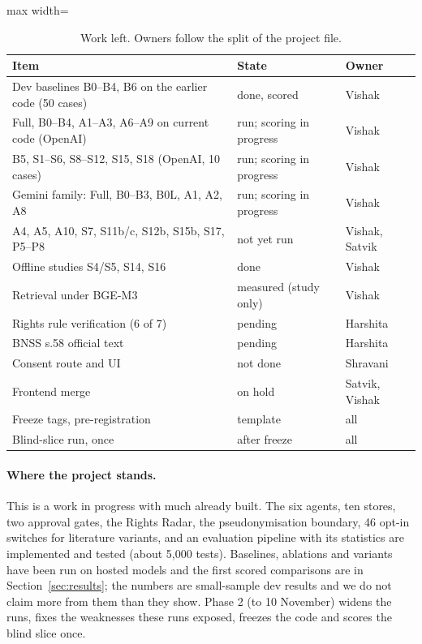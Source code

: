 \begin{table}[!t]
\centering\small
\begin{adjustbox}{max width=\textwidth}
\begin{tabular}{@{}p{3.6cm}p{1.5cm}p{1.5cm}@{}}
\toprule
Item & State & Owner \\
\midrule
Dev baselines B0--B4, B6 on the earlier code (50 cases) & done, scored & Vishak \\
Full, B0--B4, A1--A3, A6--A9 on current code (OpenAI) & run; scoring in progress & Vishak \\
B5, S1--S6, S8--S12, S15, S18 (OpenAI, 10 cases) & run; scoring in progress & Vishak \\
Gemini family: Full, B0--B3, B0L, A1, A2, A8 & run; scoring in progress & Vishak \\
A4, A5, A10, S7, S11b/c, S12b, S15b, S17, P5--P8 & not yet run & Vishak, Satvik \\
Offline studies S4/S5, S14, S16 & done & Vishak \\
Retrieval under BGE-M3 & measured (study only) & Vishak \\
Rights rule verification (6 of 7) & pending & Harshita \\
BNSS s.58 official text & pending & Harshita \\
Consent route and UI & not done & Shravani \\
Frontend merge & on hold & Satvik, Vishak \\
Freeze tags, pre-registration & template & all \\
Blind-slice run, once & after freeze & all \\
\bottomrule
\end{tabular}
\end{adjustbox}
\caption{Work left. Owners follow the split of the project file.}
\label{tab:status}
\end{table}

\paragraph{Where the project stands.} This is a work in progress with much already built. The six agents, ten stores, two approval gates, the Rights Radar, the pseudonymisation boundary, 46 opt-in switches for literature variants, and an evaluation pipeline with its statistics are implemented and tested (about 5,000 tests). Baselines, ablations and variants have been run on hosted models and the first scored comparisons are in Section~\ref{sec:results}; the numbers are small-sample dev results and we do not claim more from them than they show. Phase 2 (to 10 November) widens the runs, fixes the weaknesses these runs exposed, freezes the code and scores the blind slice once.

